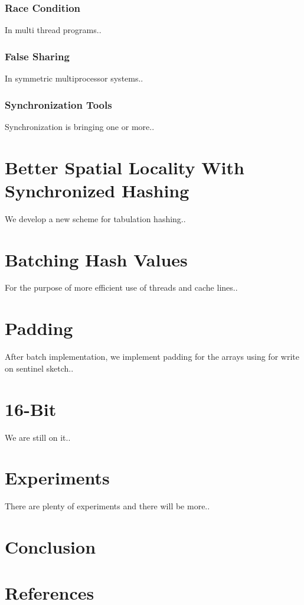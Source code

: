 \documentclass[10pt, conference, compsocconf]{IEEEtran}
\begin{document}
    \subsubsection{Race Condition}
    In multi thread programs..
    \subsubsection{False Sharing}
    In symmetric multiprocessor systems..
    \subsubsection{Synchronization Tools}
    Synchronization is bringing one or more.. 
    
    \section{Better Spatial Locality With Synchronized Hashing}
    We develop a new scheme for tabulation hashing..

    \section{Batching Hash Values}
    For the purpose of more efficient use of threads and cache lines..

    \section{Padding}
    After batch implementation, we implement padding for the arrays using for write on sentinel sketch..

    \section{16-Bit}
    We are still on it..

    \section{Experiments}
    There are plenty of experiments and there will be more..

    \section{Conclusion}


    \section{References}
    
    
\end{document}

